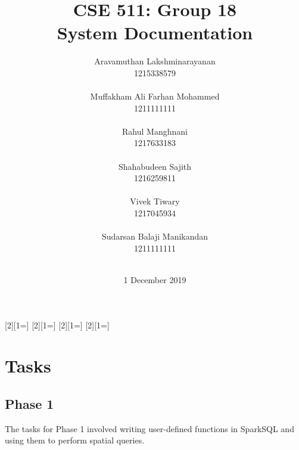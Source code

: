 \usepackage[colorinlistoftodos,prependcaption,textsize=footnotesize]{todonotes}
[2][1=]{\textcolor{Red}
{}}
[2][1=]{\textcolor{Blue}
{}}
[2][1=]{\textcolor{OliveGreen}{}}
[2][1=]{\textcolor{Plum}{}}





\title{
{\Huge CSE 511: Group 18{\large\linebreak\\} System Documentation{\large\linebreak\\}}
}
\author{
Aravamuthan Lakshminarayanan\\
1215338579\\\\
Muffakham Ali Farhan Mohammed\\
1211111111\\\\
Rahul Manghnani\\
1217633183\\\\
Shahabudeen Sajith\\
1216259811\\\\
Vivek Tiwary\\
1217045934\\\\
Sudarsan Balaji Manikandan\\
1211111111\\\\
}
\date{1 December 2019}
\maketitle
\newpage


\tableofcontents\label{c}
\newpage

\section{Tasks} \label{Tasks}
	\subsection{Phase 1} \label{Phase 1}
    The tasks for Phase 1 involved writing user-defined functions in SparkSQL and using them to perform spatial queries.\\

